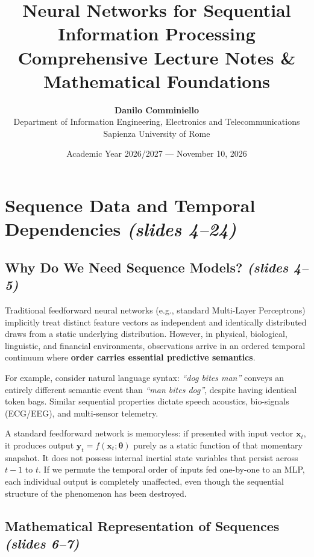 \documentclass[11pt,a4paper]{article}
\title{\textbf{\LARGE Neural Networks for Sequential Information Processing} \\ 
\Large Comprehensive Lecture Notes \& Mathematical Foundations}
\author{\textbf{Danilo Comminiello} \\ 
Department of Information Engineering, Electronics and Telecommunications \\ 
Sapienza University of Rome}
\date{Academic Year 2026/2027 --- November 10, 2026}
\theoremstyle{definition}
\theoremstyle{plain}
\begin{document}
\maketitle
\tableofcontents
\newpage

\section{Sequence Data and Temporal Dependencies \emph{(slides 4--24)}}

\subsection{Why Do We Need Sequence Models? \emph{(slides 4--5)}}
Traditional feedforward neural networks (e.g., standard Multi-Layer Perceptrons) implicitly treat distinct feature vectors as independent and identically distributed draws from a static underlying distribution. However, in physical, biological, linguistic, and financial environments, observations arrive in an ordered temporal continuum where \textbf{order carries essential predictive semantics}.

For example, consider natural language syntax: \emph{``dog bites man''} conveys an entirely different semantic event than \emph{``man bites dog''}, despite having identical token bags. Similar sequential properties dictate speech acoustics, bio-signals (ECG/EEG), and multi-sensor telemetry.

\begin{intuitionbox}
A standard feedforward network is memoryless: if presented with input vector $\mathbf{x}_t$, it produces output $\mathbf{y}_t = f(\mathbf{x}_t; \boldsymbol{\theta})$ purely as a static function of that momentary snapshot. It does not possess internal inertial state variables that persist across $t-1$ to $t$. If we permute the temporal order of inputs fed one-by-one to an MLP, each individual output is completely unaffected, even though the sequential structure of the phenomenon has been destroyed.
\end{intuitionbox}

\subsection{Mathematical Representation of Sequences \emph{(slides 6--7)}}
\end{document}
